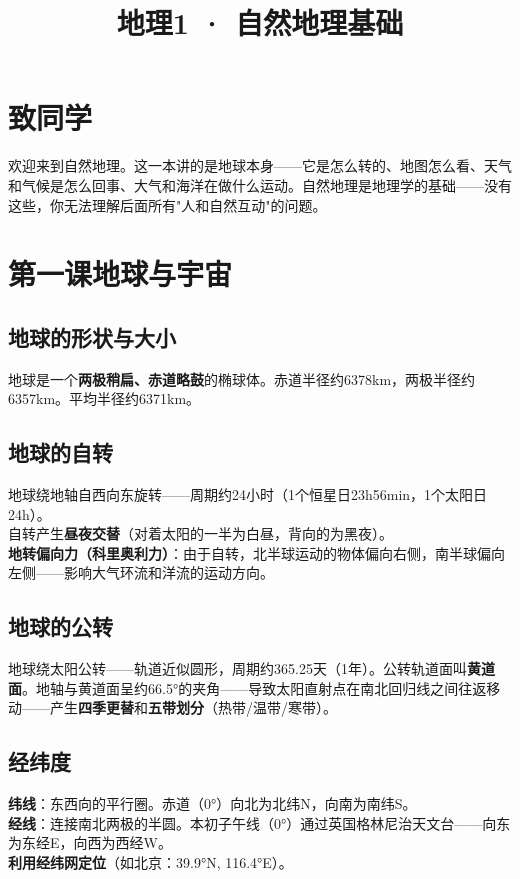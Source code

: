 \documentclass[a4paper,12pt]{ctexart}
\title{\textcolor{blue!70!black}{\Huge\textbf{地理1 · 自然地理基础}}}
\author{}\date{}
\begin{document}
\maketitle\thispagestyle{empty}
\section*{\textcolor{blue!70!black}{致同学}}
欢迎来到自然地理。这一本讲的是地球本身——它是怎么转的、地图怎么看、天气和气候是怎么回事、大气和海洋在做什么运动。自然地理是地理学的基础——没有这些，你无法理解后面所有"人和自然互动"的问题。

\newpage
\section{\textcolor{orange!80!black}{第一课\quad 地球与宇宙}}

\subsection*{地球的形状与大小}
地球是一个\textbf{两极稍扁、赤道略鼓}的椭球体。赤道半径约6378km，两极半径约6357km。平均半径约6371km。

\subsection*{地球的自转}
地球绕地轴自西向东旋转——周期约24小时（1个恒星日23h56min，1个太阳日24h）。\\
自转产生\textbf{昼夜交替}（对着太阳的一半为白昼，背向的为黑夜）。\\
\textbf{地转偏向力（科里奥利力）}：由于自转，北半球运动的物体偏向右侧，南半球偏向左侧——影响大气环流和洋流的运动方向。

\subsection*{地球的公转}
地球绕太阳公转——轨道近似圆形，周期约365.25天（1年）。公转轨道面叫\textbf{黄道面}。地轴与黄道面呈约66.5°的夹角——导致太阳直射点在南北回归线之间往返移动——产生\textbf{四季更替}和\textbf{五带划分}（热带/温带/寒带）。

\subsection*{经纬度}
\textbf{纬线}：东西向的平行圈。赤道（0°）向北为北纬N，向南为南纬S。\\
\textbf{经线}：连接南北两极的半圆。本初子午线（0°）通过英国格林尼治天文台——向东为东经E，向西为西经W。\\
\textbf{利用经纬网定位}（如北京：39.9°N, 116.4°E）。
\end{document}
